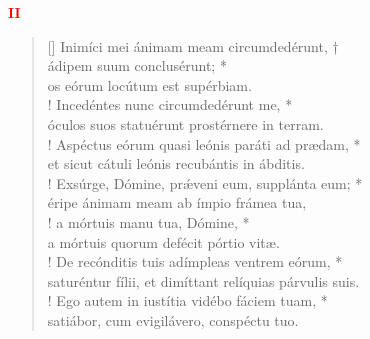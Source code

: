 \begin{center}
\textcolor{red}{\bf II}\\
\end{center}
\begin{verse}[\versewidth]
Inimíci mei ánimam meam circumdedérunt, †\\
ádipem suum conclusérunt; *\\
os eórum locútum est supérbiam.\\!
\vin Incedéntes nunc circumdedérunt me, *\\
\vin óculos suos statuérunt prostérnere in terram.\\!
Aspéctus eórum quasi leónis paráti ad prædam, *\\
et sicut cátuli leónis recubántis in ábditis.\\!
\vin Exsúrge, Dómine, pr\'{æ}veni eum, supplánta eum; *\\
\vin éripe ánimam meam ab ímpio frámea tua,\\!
a mórtuis manu tua, Dómine, *\\
a mórtuis quorum defécit pórtio vitæ.\\!
\vin De recónditis tuis adímpleas ventrem eórum, *\\
\vin saturéntur fílii, et dimíttant relíquias párvulis suis.\\!
Ego autem in iustítia vidébo fáciem tuam, *\\
satiábor, cum evigilávero, conspéctu tuo.\\
\end{verse}
\vspace{1cm}



